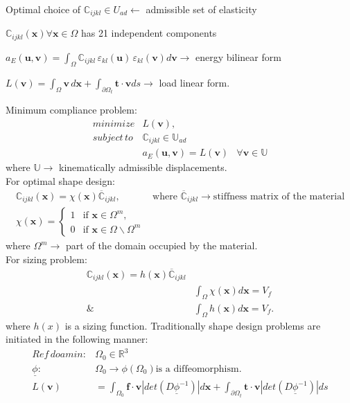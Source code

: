 \documentclass[10pt]{article}
\begin{document}
Optimal choice of $\mathbb{C}_{ijkl} \in U_{ad} \leftarrow $ admissible set of elasticity \par $\mathbb{C}_{ijkl}(\textbf{x}) \forall \textbf{x} \in \Omega $ has 21 independent components \par $a_E(\textbf{u}, \textbf{v}) = \int_\Omega \mathbb{C}_{ijkl}\,\varepsilon_{kl}(\textbf{u})\,\varepsilon_{kl}(\textbf{v})d\textbf{v} \rightarrow $ energy bilinear form \par
$L(\textbf{v}) = \int_\Omega \textbf{v}\, d\textbf{x}+\int_{\partial\Omega_t} \textbf{t}\cdot\textbf{v}ds \rightarrow $ load linear form.\par
\hfill \break
Minimum compliance problem:
\begin{eqnarray}
minimize & L(\textbf{v}),\\
subject\, to & \mathbb{C}_{ijkl} \in \mathbb{U}_{ad}\\
		  & a_E(\textbf{u}, \textbf{v}) = L(\textbf{v}) &\forall \textbf{v} \in \mathbb{U} 
\end{eqnarray}
where $\mathbb{U}\rightarrow $ kinematically admissible displacements.\\
For optimal shape design:
\begin{eqnarray}
\mathbb{C}_{ijkl}(\textbf{x}) = \chi(\textbf{x})\overline{\mathbb{C}}_{ijkl}, & \textrm{where  } \overline{\mathbb{C}}_{ijkl}\rightarrow\textrm{stiffness matrix of the material}\\
\chi(\textbf{x}) =
    \begin{cases}
        1 & \text{if $\textbf{x}\in \Omega^m$,}\\
        0 & \text{if $\textbf{x}\in \Omega\backslash\Omega^m$}
    \end{cases}
\end{eqnarray}
where $\Omega^m \rightarrow$ part of the domain occupied by the material.\\
For sizing problem:
\begin{eqnarray}
\mathbb{C}_{ijkl}(\textbf{x}) = h(\textbf{x})\overline{\mathbb{C}}_{ijkl}\\
& \int_\Omega \chi(\textbf{x})d\textbf{x}=V_f\\
\& & \int_\Omega h(\textbf{x})d\textbf{x}=V_f.
\end{eqnarray}
where $h(x)$ is a sizing function. \hfill
\break
Traditionally shape design problems are initiated in the following manner:
\begin{align}
Ref\, doamin: & \Omega_0\in \mathbb{R}^3\\
\underline{\phi}:  & \Omega_0 \rightarrow \phi(\Omega_0) \text{is a diffeomorphism.}\\
L(\textbf{v})&=\int_{\Omega_0} \textbf{f}\cdot\textbf{v} |det(D\underline{\phi}^{-1})|d\textbf{x}+\int_{\partial\Omega_t} \textbf{t}\cdot\textbf{v}|det(D\underline{\phi}^{-1})|ds
\end{align}
\end{document}

